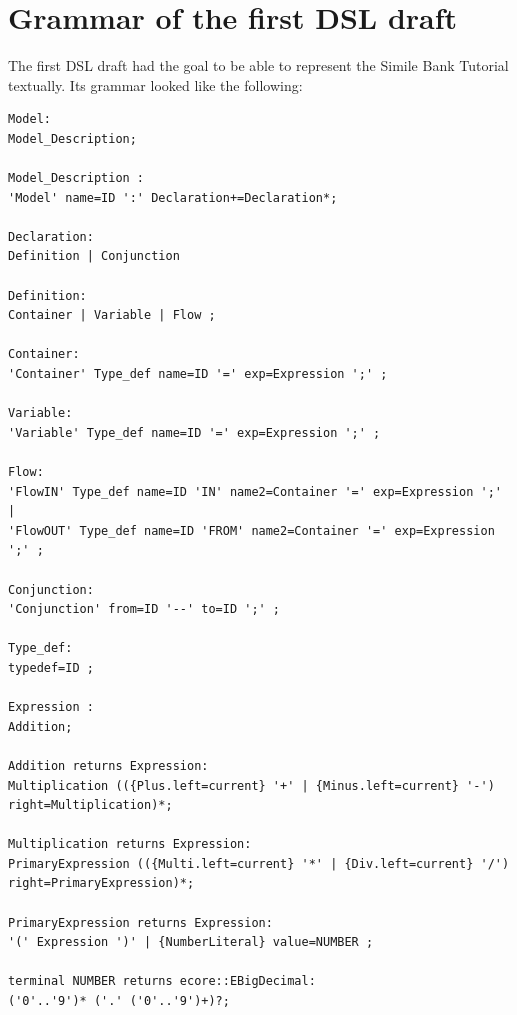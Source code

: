 \section{Grammar of the first DSL draft} \label{sec:first_dsl_draft}
\par
The first DSL draft had the goal to be able to represent the Simile Bank Tutorial \autocite{dsl:similie_tutorial_bank} textually. Its grammar looked like the following:
\begin{lstlisting}
Model:
Model_Description;

Model_Description :
'Model' name=ID ':' Declaration+=Declaration*;

Declaration:
Definition | Conjunction

Definition:
Container | Variable | Flow ;

Container:
'Container' Type_def name=ID '=' exp=Expression ';' ;

Variable:
'Variable' Type_def name=ID '=' exp=Expression ';' ;

Flow:
'FlowIN' Type_def name=ID 'IN' name2=Container '=' exp=Expression ';' |
'FlowOUT' Type_def name=ID 'FROM' name2=Container '=' exp=Expression ';' ;

Conjunction:
'Conjunction' from=ID '--' to=ID ';' ;

Type_def:
typedef=ID ;

Expression :
Addition;

Addition returns Expression:
Multiplication (({Plus.left=current} '+' | {Minus.left=current} '-') right=Multiplication)*;

Multiplication returns Expression:
PrimaryExpression (({Multi.left=current} '*' | {Div.left=current} '/') right=PrimaryExpression)*;

PrimaryExpression returns Expression:
'(' Expression ')' | {NumberLiteral} value=NUMBER ;

terminal NUMBER returns ecore::EBigDecimal:
('0'..'9')* ('.' ('0'..'9')+)?;
\end{lstlisting}

